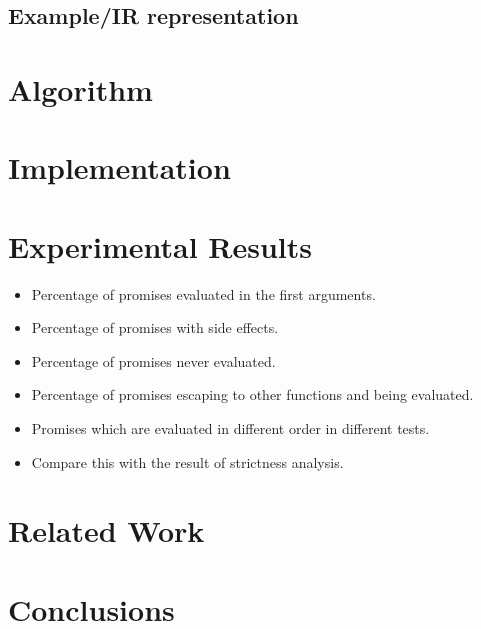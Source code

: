 \documentclass[sigplan,10pt]{acmart}\settopmatter{}
\begin{document}
\subsection{Example/IR representation}


\section{Algorithm}

\section{Implementation}

\section{Experimental Results}
\begin{itemize}
\item Percentage of promises evaluated in the first arguments.
\item Percentage of promises with side effects.
\item Percentage of promises never evaluated.
\item Percentage of promises escaping to other functions and being evaluated.
\item Promises which are evaluated in different order in different tests.
\item Compare this with the result of strictness analysis.
\end{itemize}

\section{Related Work}

\section{Conclusions}
\end{document}
